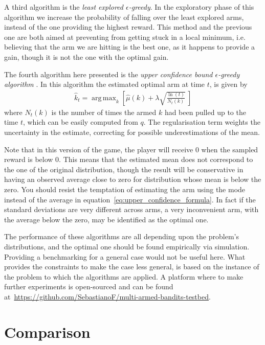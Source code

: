 \documentclass[]{scrartcl}
\DeclareMathOperator*{\argmax}{arg\,max}
\theoremstyle{definition}
\begin{document}
A third algorithm is the \emph{least explored $\epsilon$-greedy}. In the exploratory phase of this algorithm we increase the probability of falling over the least explored arms, instead of the one providing the highest reward. This method and the previous one are both aimed at preventing from getting stuck in a local minimum, i.e. believing that the arm we are hitting is the best one, as it happens to provide a gain, though it is not the one with the optimal gain.

The fourth algorithm here presented is the \emph{upper confidence bound $\epsilon$-greedy algorithm} \cite{sutton2018reinforcement}. In this algorithm the estimated optimal arm at time $t$, is given by
\begin{align}\label{eq:upper_confidence_formula}
\hat{k}_t = \argmax_{k} \left[ \hat{\mu}(k) + \lambda \sqrt{ \frac{\ln(t)}{ N_{t}(k) }  } ~\right]
\end{align}
where $N_{t}(k)$ is the number of times the armed $k$ had been pulled up to the time $t$, which can be easily computed from $q$. The regularisation term weights the uncertainty in the estimate, correcting for possible underestimations of the mean.

Note that in this version of the game, the player will receive $0$ when the sampled reward is below $0$. This means that the estimated mean does not correspond to the one of the original distribution, though the result will be conservative in having an observed average close to zero for distribution whose mean is below the zero. You should resist the temptation of estimating the arm using the mode instead of the average in equation~\ref{eq:upper_confidence_formula}. In fact if the standard deviations are very different across arms, a very inconvenient arm, with the average below the zero, may be identified as the optimal one.

The performance of these algorithms are all depending upon the problem's distributions, and the optimal one should be found empirically via simulation. Providing a benchmarking for a general case would not be useful here. What provides the constraints to make the case less general, is based on the instance of the problem to which the algorithms are applied. A platform where to make further experiments is open-sourced and can be found at~\href{https://github.com/SebastianoF/multi-armed-bandits-testbed}{https://github.com/SebastianoF/multi-armed-bandits-testbed}.


\section{Comparison}
\label{se:outro}
\end{document}

